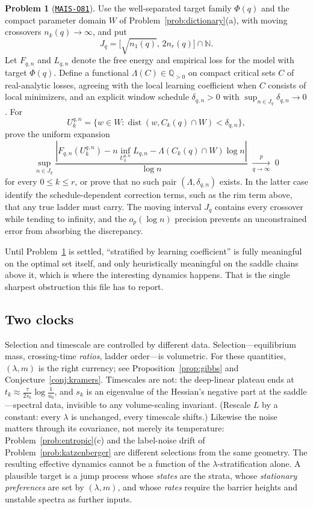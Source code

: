 \documentclass[11pt]{amsart}
\newcommand{\Oid}[1]{\href{https://github.com/lionellevine/MAIS/blob/main/open-problems/MAIS-O#1.md}{\texttt{MAIS-O#1}}}
\theoremstyle{plain}
\theoremstyle{definition}
\newtheorem{problem}[theorem]{Problem}
\newcommand{\Q}{\mathbb{Q}}
\newcommand{\dist}{\operatorname{dist}}
\begin{document}
\begin{problem}[\Oid{81}]\label{prob:saddle-free-energy}
Use the well-separated target family $\Phi(q)$ and the compact parameter domain $W$ of Problem~\ref{prob:dictionary}(a), with moving crossovers $n_k(q)\to\infty$, and put
\[
   J_q=\bigl[\sqrt{n_1(q)},\,2n_r(q)\bigr]\cap\mathbb{N}.
\]
Let $F_{q,n}$ and $L_{q,n}$ denote the free energy and empirical loss for the model with target $\Phi(q)$. Define a functional $\Lambda(C) \in \Q_{>0}$ on compact critical sets $C$ of real-analytic losses, agreeing with the local learning coefficient when $C$ consists of local minimizers, and an explicit window schedule $\delta_{q,n}>0$ with $\sup_{n\in J_q}\delta_{q,n}\to0$. For
\[
   U_{k}^{q,n}
   =
   \{w\in W:\dist(w,C_k(q)\cap W)<\delta_{q,n}\},
\]
prove the uniform expansion
\[
   \sup_{n\in J_q}
   \frac{\left|
   F_{q,n}(U_k^{q,n})
   -n\inf_{U_k^{q,n}}L_{q,n}
   -\Lambda(C_k(q)\cap W)\log n
   \right|}{\log n}
   \;\xrightarrow[q\to\infty]{p}\;0
\]
for every $0\le k\le r$, or prove that no such pair $(\Lambda,\delta_{q,n})$ exists. In the latter case identify the schedule-dependent correction terms, such as the rim term above, that any true ladder must carry. The moving interval $J_q$ contains every crossover while tending to infinity, and the $o_p(\log n)$ precision prevents an unconstrained error from absorbing the discrepancy.
\end{problem}

Until Problem~\ref{prob:saddle-free-energy} is settled, ``stratified by learning coefficient'' is fully meaningful on the optimal set itself, and only heuristically meaningful on the saddle chains above it, which is where the interesting dynamics happens. That is the single sharpest obstruction this file has to report.

\subsection{Two clocks}\label{sec:two-clocks}

Selection and timescale are controlled by different data. Selection---equilibrium mass, crossing-time \emph{ratios}, ladder order---is volumetric. For these quantities, $(\lambda,m)$ is the right currency; see Proposition~\ref{prop:gibbs} and Conjecture~\ref{conj:kramers}. Timescales are not: the deep-linear plateau ends at $t_k \approx \tfrac{\tau}{2 s_k} \log \tfrac{1}{u_0}$, and $s_k$ is an eigenvalue of the Hessian's negative part at the saddle---spectral data, invisible to any volume-scaling invariant. (Rescale $L$ by a constant: every $\lambda$ is unchanged, every timescale shifts.) Likewise the noise matters through its covariance, not merely its temperature: Problem~\ref{prob:entropic}(c) and the label-noise drift of Problem~\ref{prob:katzenberger} are different selections from the same geometry. The resulting effective dynamics cannot be a function of the $\lambda$-stratification alone. A plausible target is a jump process whose \emph{states} are the strata, whose \emph{stationary preferences} are set by $(\lambda, m)$, and whose \emph{rates} require the barrier heights and unstable spectra as further inputs.
\end{document}
